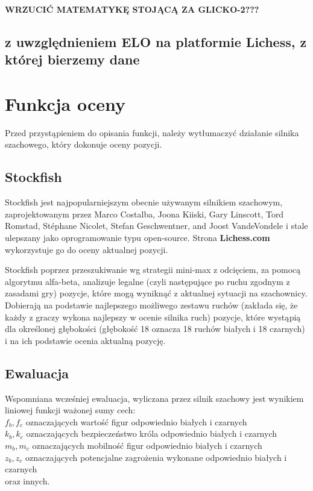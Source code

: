 \documentclass[inzynierska]{pwr_wmat_praca_dyplomowa}
\theoremstyle{plain}
\numberwithin{theorem}{chapter}
\theoremstyle{definition}
\numberwithin{theorem}{chapter}
\begin{document}
\textbf{WRZUCIĆ MATEMATYKĘ STOJĄCĄ ZA GLICKO-2???}
\subsection{z uwzględnieniem ELO na platformie Lichess, z której bierzemy dane}
\section{Funkcja oceny}
Przed przystąpieniem do opisania funkcji, należy wytłumaczyć działanie silnika szachowego, który dokonuje oceny pozycji.
\subsection{Stockfish}
Stockfish jest najpopularniejszym obecnie używanym silnikiem szachowym, zaprojektowanym przez Marco Costalba, Joona Kiiski, Gary Linscott, Tord Romstad, Stéphane Nicolet, Stefan Geschwentner, and Joost VandeVondele i stale ulepszany jako oprogramowanie typu open-source. Strona \textbf{Lichess.com}\cite{stockfish_lichess} wykorzystuje go do oceny aktualnej pozycji.

Stockfish poprzez przeszukiwanie wg strategii mini-max z odcięciem, za pomocą algorytmu alfa-beta, analizuje legalne (czyli następujące po ruchu zgodnym z zasadami gry) pozycje, które mogą wyniknąć z aktualnej sytuacji na szachownicy. Dobierają na podstawie najlepszego możliwego zestawu ruchów (zakłada się, że każdy z graczy wykona najlepszy w ocenie silnika ruch) pozycje, które wystąpią dla określonej głębokości (głębokość 18 oznacza 18 ruchów białych i 18 czarnych) i na ich podstawie ocenia aktualną pozycję.

\subsection{Ewaluacja}
Wspomniana wcześniej ewaluacja, wyliczana przez silnik szachowy jest wynikiem liniowej funkcji 
ważonej sumy cech:\\
$f_b,f_c$ oznaczających wartość figur odpowiednio białych i czarnych\\
$k_b,k_c$ oznaczających bezpieczeństwo króla odpowiednio białych i czarnych\\
$m_b,m_c$ oznaczających mobilność figur odpowiednio białych i czarnych\\
$z_b,z_c$ oznaczających potencjalne zagrożenia wykonane odpowiednio białych i czarnych\\
oraz innych.
\end{document}
